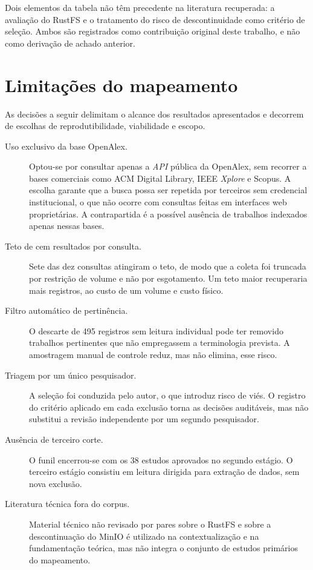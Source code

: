Dois elementos da tabela não têm precedente na literatura recuperada: a avaliação
do RustFS e o tratamento do risco de descontinuidade como critério de seleção.
Ambos são registrados como contribuição original deste trabalho, e não como
derivação de achado anterior.

\section{Limitações do mapeamento}
\label{sec:limitacoes-mapeamento}

As decisões a seguir delimitam o alcance dos resultados apresentados e decorrem
de escolhas de reprodutibilidade, viabilidade e escopo.

\begin{description}
    \item[Uso exclusivo da base OpenAlex.] Optou-se por consultar apenas a
          \textit{API} pública da OpenAlex, sem recorrer a bases comerciais como
          ACM Digital Library, IEEE \textit{Xplore} e Scopus. A escolha garante
          que a busca possa ser repetida por terceiros sem credencial
          institucional, o que não ocorre com consultas feitas em interfaces web
          proprietárias. A contrapartida é a possível ausência de trabalhos
          indexados apenas nessas bases.

    \item[Teto de cem resultados por consulta.] Sete das dez consultas atingiram
          o teto, de modo que a coleta foi truncada por restrição de volume e não
          por esgotamento. Um teto maior recuperaria mais registros, ao custo de
          um volume e custo físico.

    \item[Filtro automático de pertinência.] O descarte de 495 registros sem
          leitura individual pode ter removido trabalhos pertinentes que não
          empregassem a terminologia prevista. A amostragem manual de controle
          reduz, mas não elimina, esse risco.

    \item[Triagem por um único pesquisador.] A seleção foi conduzida pelo autor,
          o que introduz risco de viés. O registro do critério aplicado em cada
          exclusão torna as decisões auditáveis, mas não substitui a revisão
          independente por um segundo pesquisador.

    \item[Ausência de terceiro corte.] O funil encerrou-se com os 38 estudos
          aprovados no segundo estágio. O terceiro estágio consistiu em leitura
          dirigida para extração de dados, sem nova exclusão.

    \item[Literatura técnica fora do corpus.] Material técnico não revisado por
          pares sobre o RustFS e sobre a descontinuação do MinIO é utilizado na
          contextualização e na fundamentação teórica, mas não integra o conjunto
          de estudos primários do mapeamento.
\end{description}